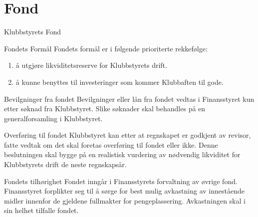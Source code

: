 \chapter{Fond}

\begin{fond}{Klubbstyrets Fond}
    \begin{fondsparagraf}{Fondets Formål}
        Fondets formål er i følgende prioriterte rekkefølge:
        \begin{enumerate}
            \item å utgjøre likviditetsreserve for Klubbstyrets drift.
            \item å kunne benyttes til investeringer som kommer Klubbaften til gode.
        \end{enumerate}
    \end{fondsparagraf}

    \begin{fondsparagraf}{Bevilgninger fra fondet}
        Bevilgninger eller lån fra fondet vedtas i Finansstyret kun etter søknad fra
        Klubbstyret. Slike søknader skal behandles på en generalforsamling i Klubbstyret.
    \end{fondsparagraf}

    \begin{fondsparagraf}{Overføring til fondet}
Klubbstyret kan etter at regnskapet er godkjent av revisor, fatte vedtak om det skal foretas overføring til fondet eller
ikke. Denne beslutningen skal bygge på en realistisk vurdering av nødvendig likviditet for Klubbstyrets drift de neste
regnskapsår.
    \end{fondsparagraf}
    
    \begin{fondsparagraf}{Fondets tilhørighet}
Fondet inngår i Finansstyrets forvaltning av øvrige fond. Finansstyret forplikter seg til å sørge for best mulig
avkastning av innestående midler innenfor de gjeldene fullmakter for pengeplassering. Avkastningen skal i sin helhet
tilfalle fondet.
    \end{fondsparagraf}
    
    
    


\end{fond}


